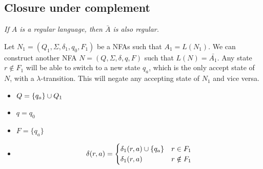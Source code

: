 \documentclass{article}
\newcommand{\emptyString}{\lambda}
\begin{document}
\begin{center}
\end{center}

\subsection{Closure under complement}

\textit{If \(A\) is a regular language, then \(\bar{A}\) is also regular.}

Let \(N_1 = (Q_1, \Sigma, \delta_1, q_0, F_1)\) be a NFAs such that
\(A_1 = L(N_1)\). We can construct another NFA \(N=(Q, \Sigma, \delta, q, F)\)
such that \(L(N)=\bar{A_1}\).
Any state \(r \notin F_1\) will be able to switch to a new state \(q_a\),
which is the only accept state of \(N\), with a \(\emptyString\)-transition.
This will negate any accepting state of \(N_1\) and vice versa.

\begin{itemize}
    \item \(Q=\{q_a\} \cup Q_1\)
    \item \(q = q_0\)
    \item \(F = \{q_a\}\)
    \item \[
        \delta(r,a) =
        \begin{cases}
            \delta_1(r,a) \cup \{q_a\} & r \in F_1 \\
            \delta_1(r,a) & r \notin F_1 \\
        \end{cases}
    \]
\end{itemize}
\end{document}
